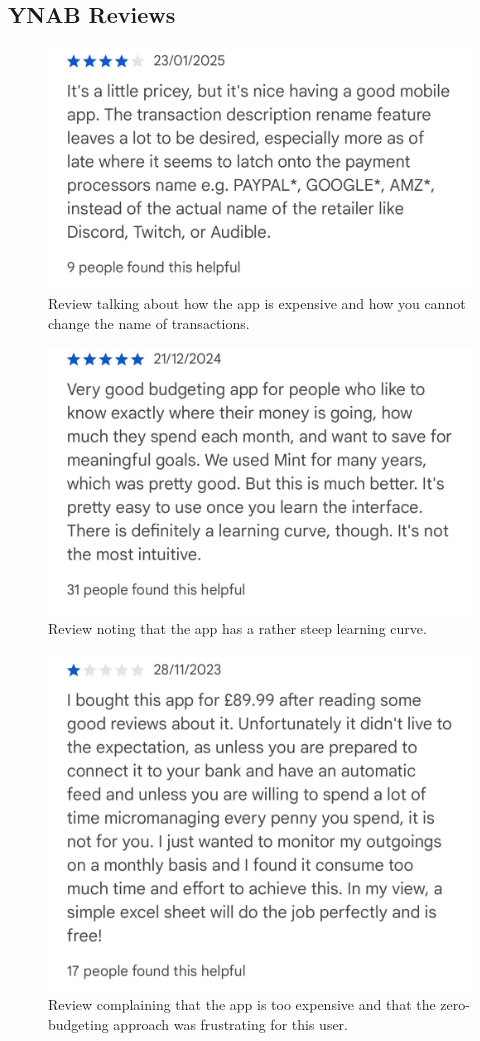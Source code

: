 \documentclass{l4proj}
\begin{document}
\begin{appendices}
\section{YNAB Reviews}
\begin{figure}[H]
    \centering
    \includegraphics[width=0.5\linewidth]{images/App-Comparison/ynab-review-1.png}
    \caption{Review talking about how the app is expensive and how you cannot change the name of transactions.}
    \label{fig:enter-label}
\end{figure}
\begin{figure}[H]
    \centering
    \includegraphics[width=0.5\linewidth]{images/App-Comparison/ynab-review-2.png}
    \caption{Review noting that the app has a rather steep learning curve.}
    \label{fig:enter-label}
\end{figure}
\begin{figure}[H]
    \centering
    \includegraphics[width=0.5\linewidth]{images/App-Comparison/ynab-review-3.png}
    \caption{Review complaining that the app is too expensive and that the zero-budgeting approach was frustrating for this user.}
    \label{fig:enter-label}
\end{figure}


\end{appendices}
\end{document}
